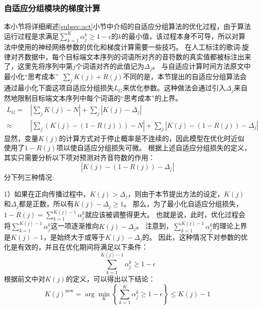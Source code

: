 \subsubsection{自适应分组模块的梯度计算}
本小节将详细阐述\ref{subsec:act}小节中介绍的自适应分组算法的优化过程，由于算法运行过程是求满足$\sum_{k=1}^K \alpha_j^k \geq 1-\epsilon$的$k$的最小值，该过程本身不可导，所以对算法中使用的神经网络参数的优化和梯度计算需要一些技巧。
在人工标注的歌词-旋律对齐数据中，每个目标端文本序列的词语所对齐的音符数的真实值都被标注出来了，这里先将序列中第$j$个词语对齐的此值记为$\Delta_j$。
与自适应计算时间方法\citep{act}原文中最小化``思考成本''~$\sum_j K(j) + R(j)$不同的是，本节提出的自适应分组算法会通过最小化下面这项自适应分组损失$L_G$来优化参数。这种做法会通过引入$\Delta_j$来自然地限制目标端文本序列中每个词语的``思考成本''的上界。
\begin{equation}
\begin{array}{rl}
    L_G = & \left| \sum_j K(j) - N \right| + \sum_j \left|K(j) - \Delta_j\right| \\
    \approx &\left|\sum_j \left(K(j) - (1 - R(j))\right) - N \right| + \sum_j \left|K(j) - (1 - R(j)) - \Delta_j\right|
\end{array}
\end{equation}
显然，变量$K(j)$的计算方式对于停止概率是不连续的，因此模型在优化时近似使用了$1-R(j)$项以使自适应分组损失可微。
根据上述自适应分组损失的定义，其实只需要分析以下项对预测对齐音符数的作用：
\begin{equation}
    \left| K(j) - (1 - R(j)) - \Delta_j \right|
\end{equation}
分下列三种情况:

1）如果在正向传播过程中，$K(j) > \Delta_j$，则由于本节提出方法的设定，$K(j)$和$\Delta_j$都是正数，所以有$K(j) - \Delta_j \geq 1$。
那么，为了最小化自适应分组损失，$1 - R(j)=\sum_{k=1}^{K(j)-1}\alpha_j^k$就应该被调整得更大。
也就是说，此时，优化过程会将$\sum_{k=1}^{K(j)-1}\alpha_j^k$这一项逐渐推向$K(j) - \Delta_j$。
注意到，$\sum_{k=1}^{K(j)-1}\alpha_j^k$的理论上界是$K(j)- 1$，是始终大于或等于$K(j)- \Delta_j$的。
因此，这种情况下对参数的优化是有效的，并且在优化期间将满足以下条件：
\begin{equation}
    \sum_{k=1}^{K(j)-1}\alpha_j^k \geq 1 - \epsilon
\end{equation}
根据前文中对$K(j)$的定义，可以得出以下结论：
\begin{equation}
    K(j)^{\text{new}} = \arg\min_{K}\left\{\sum_{k=1}^K \alpha_j^k \geq 1 - \epsilon\right\} \leq K(j) - 1
\end{equation}


